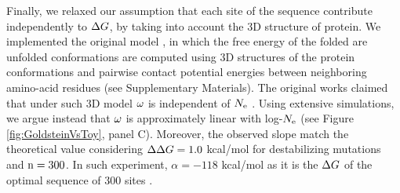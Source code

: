 \documentclass{article}
\begin{document}
Finally, we relaxed our assumption that each site of the sequence contribute independently to $\Delta G$, by taking into account the $3$D structure of protein.
We implemented the original model \cite{Williams2006, Goldstein2011, Pollock2012}, in which the free energy of the folded are unfolded conformations are computed using $3$D structures of the protein conformations and pairwise contact potential energies between neighboring amino-acid residues \cite{Miyazawa1985} (see Supplementary Materials).
The original works claimed that under such $3$D model $\omega$ is independent of $N_{\mathrm{e}}$ \cite{Goldstein2013}.
Using extensive simulations, we argue instead that $\omega$ is approximately linear with log-$N_{\mathrm{e}}$ (see Figure \ref{fig:GoldsteinVsToy}, panel C).
Moreover, the observed slope match the theoretical value considering $\Delta \Delta G = 1.0$ kcal/mol for destabilizing mutations and $\text{n}=300$. 
In such experiment, $\alpha=-118$ kcal/mol as it is the $\Delta G$ of the optimal sequence of $300$ sites \cite{Goldstein2011}.
\end{document}
